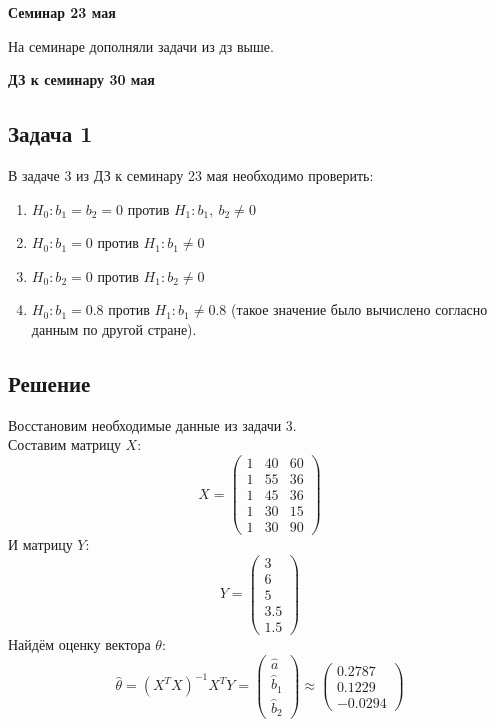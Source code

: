 \documentclass[12pt, a4paper]{article}
\begin{document}
\begin{center}
    \bf Семинар 23 мая
\end{center}
На семинаре дополняли задачи из дз выше.
\begin{center}
    \bf ДЗ к семинару 30 мая
\end{center}
\subsection*{Задача 1}
В задаче 3 из ДЗ к семинару 23 мая необходимо проверить:
\begin{enumerate}
    \item $H_0: b_1 = b_2 = 0$ против $H_1: b_1,\ b_2 \neq 0$
    \item $H_0: b_1 = 0$ против $H_1: b_1 \neq 0$
    \item $H_0: b_2 = 0$ против $H_1: b_2 \neq 0$
    \item $H_0: b_1 = 0.8$ против $H_1: b_1 \neq 0.8$ (такое значение было вычислено согласно данным по другой стране).
\end{enumerate}
\subsection*{Решение}
Восстановим необходимые данные из задачи 3.\\
Составим матрицу $X$:
\[
X = \begin{pmatrix}
    1 & 40 & 60\\
    1 & 55 & 36\\
    1 & 45 & 36\\
    1 & 30 & 15\\
    1 & 30 & 90
\end{pmatrix}
\]
И матрицу $Y$:
\[
Y = \begin{pmatrix}
    3\\
    6\\
    5\\
    3.5\\
    1.5
\end{pmatrix}
\]
Найдём оценку вектора $\theta$:
\[
\hat \theta = \left( X^T X \right)^{-1} X^T Y = 
\begin{pmatrix}
    \hat a\\
    \hat b_1\\
    \hat b_2
\end{pmatrix}
\approx \begin{pmatrix}
    0.2787\\
    0.1229\\
    -0.0294
\end{pmatrix}
\]
\end{document}
